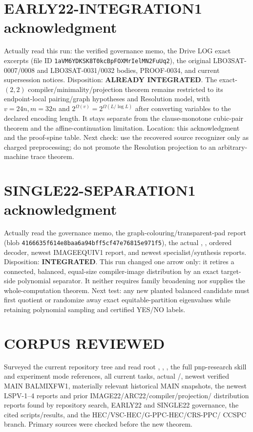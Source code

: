\documentclass[11pt]{article}
\begin{document}
\section{EARLY22-INTEGRATION1 acknowledgment}
Actually read this run: the verified governance memo, the Drive LOG exact
excerpts (file ID \texttt{1aVM6YDKSK8T0kcBpFOXMrIelMN2FuUq2}), the original
LBO3SAT-0007/0008 and LBO3SAT-0031/0032 bodies, PROOF-0034, and current
supersession notices.  Disposition: \textbf{ALREADY INTEGRATED}.  The
exact-$(2,2)$ compiler/minimality/projection theorem remains restricted to its
endpoint-local pairing/graph hypotheses and Resolution model, with
$v=24n,m=32n$ and $2^{\Omega(v)}=2^{\Omega(L/\log L)}$ after converting
variables to the declared encoding length.  It stays separate from the
clause-monotone cubic-pair theorem and the affine-continuation limitation.
Location: this acknowledgment and the proof-spine table.  Next check: use the
recovered source recognizer only as charged preprocessing; do not promote the
Resolution projection to an arbitrary-machine trace theorem.

\section{SINGLE22-SEPARATION1 acknowledgment}
Actually read the governance memo, the graph-colouring/transparent-pad report
(blob \texttt{4166635f614e8baa6a94bff5cf47e76815e971f5}), the actual
, , ordered decoder, newest
IMAGEEQUIV1 report, and newest specialist/synthesis reports.  Disposition:
\textbf{INTEGRATED}.  This run changed one arrow only: it retires a connected,
balanced, equal-size compiler-image distribution by an exact target-side
polynomial separator.  It neither requires family broadening nor supplies the
whole-computation theorem.  Next test: any new planted balanced candidate must
first quotient or randomize away exact equitable-partition eigenvalues while
retaining polynomial sampling and certified YES/NO labels.

\section{CORPUS REVIEWED}
Surveyed the current repository tree and read root ,
, , the full pnp-research skill and experiment
mode references, all current tasks, actual /,
newest verified MAIN BALMIXFW1, materially relevant historical MAIN snapshots,
the newest LSPV-1--4 reports and prior IMAGE22/ARC22/compiler/projection/
distribution reports found by repository search, EARLY22 and SINGLE22
governance, the cited scripts/results, and the HEC/VSC-HEC/G-PPC-HEC/CRS-PPC/
CCSPC branch.  Primary sources \cite{davidfeige,barucca,bt,cr} were checked
before the new theorem.
\end{document}
